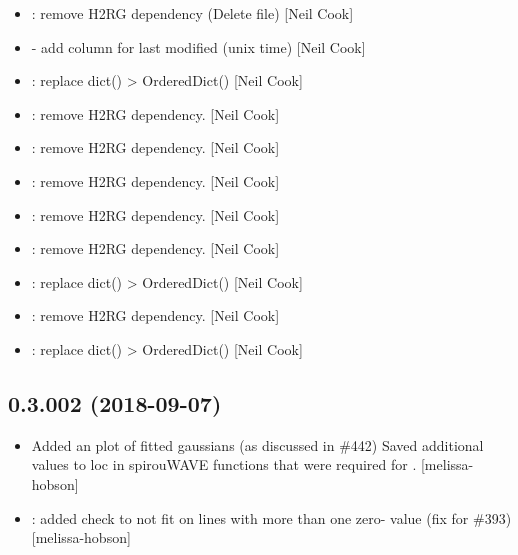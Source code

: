 \documentclass[a4paper,10pt,english]{report}
\begin{document}
\begin{itemize}
\item {} 
: remove H2RG dependency (Delete file) {[}Neil
Cook{]}

\item {} 
 - add column for last modified (unix time)
{[}Neil Cook{]}

\item {} 
: replace dict() \textendash{}\textgreater{} OrderedDict() {[}Neil Cook{]}

\item {} 
: remove H2RG dependency. {[}Neil Cook{]}

\item {} 
: remove H2RG dependency. {[}Neil Cook{]}

\item {} 
: remove H2RG dependency. {[}Neil Cook{]}

\item {} 
: remove H2RG dependency. {[}Neil Cook{]}

\item {} 
: remove H2RG dependency. {[}Neil Cook{]}

\item {} 
: replace dict() \textendash{}\textgreater{} OrderedDict() {[}Neil Cook{]}

\item {} 
: remove H2RG dependency. {[}Neil Cook{]}

\item {} 
: replace dict() \textendash{}\textgreater{} OrderedDict() {[}Neil Cook{]}

\end{itemize}


\subsection{0.3.002 (2018-09-07)}
\label{\detokenize{misc/changelog:id332}}\begin{itemize}
\item {} 
Added an  plot of fitted gaussians (as discussed in \#442)
Saved additional values to loc in spirouWAVE functions that were
required for . {[}melissa-hobson{]}

\item {} 
: added check to not fit on lines with more than one zero-
value (fix for \#393) {[}melissa-hobson{]}

\end{itemize}
\end{document}
